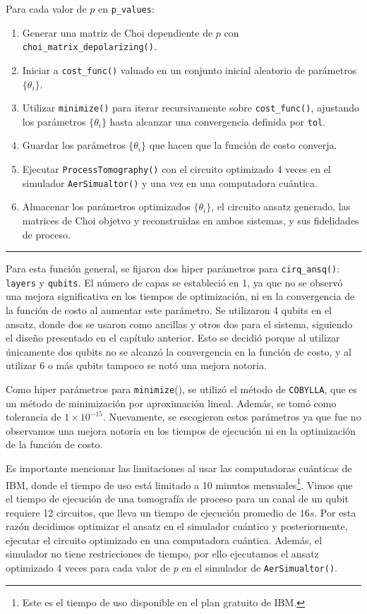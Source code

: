 \documentclass[letterpaper,12pt]{thesisECFM}
\theoremstyle{plain}
\theoremstyle{definition}
\theoremstyle{remark}
\newcommand{\1}{\mathbb{1}}
\begin{document}
Para cada valor de $p$ en \texttt{p\_values}: 
\begin{enumerate}
    \item Generar una matriz de Choi dependiente de $p$ con \texttt{choi\_matrix\_depolarizing()}.
    \item Iniciar a  \texttt{cost\_func()} valuado en un conjunto inicial aleatorio de parámetros $\{\theta_i\}$. 
   \item Utilizar \texttt{minimize()} para iterar recursivamente sobre \texttt{cost\_func()}, ajustando los parámetros $\{\theta_i\}$ hasta alcanzar una convergencia definida por \texttt{tol}.
   \item Guardar los parámetros $\{ \theta_i\}$ que hacen que la función de costo converja. 
   \item Ejecutar \texttt{ProcessTomography()} con el circuito optimizado 4 veces en el simulador \texttt{AerSimualtor()} y una vez en una computadora cuántica. 
    \item Almacenar los parámetros optimizados $\{ \theta_i\}$, el circuito ansatz generado, las matrices de Choi objetvo y reconstruidas en ambos sistemas, y sus fidelidades de proceso. 
\end{enumerate}
\vspace{-.5cm}
\noindent\rule{\textwidth}{1mm}
Para esta función general, se fijaron dos hiper parámetros para \texttt{cirq\_ansq()}: \texttt{layers} y \texttt{qubits}. El número de capas se estableció en 1, ya que no se observó una mejora significativa en los tiempos de optimización, ni en la convergencia de la función de costo al aumentar este parámetro. Se utilizaron 4 qubits en el ansatz, donde dos se usaron como ancillas y otros dos para el sistema, siguiendo el diseño presentado en el capítulo anterior. Esto se decidió porque al utilizar únicamente dos qubits no se alcanzó la convergencia en la función de costo, y al utilizar 6 o más qubits tampoco se notó una mejora notoria.

Como hiper parámetros para \texttt{minimize}(), se utilizó el método de \texttt{COBYLLA}, que es un método de minimización por aproximación lineal. Además, se tomó como tolerancia de $1\times 10^{-15}$. Nuevamente, se escogieron estos parámetros ya que fue no observamos una mejora notoria en los tiempos de ejecución ni en la optimización de la función de costo.

Es importante mencionar las limitaciones al usar las computadoras cuánticas de IBM, donde el tiempo de uso está limitado a 10 minutos mensuales\footnote{Este es el tiempo de uso disponible en el plan gratuito de IBM.}. Vimos que el  tiempo de ejecución de una tomografía de proceso para un canal de un qubit requiere 12 circuitos, que lleva un tiempo de ejecución promedio de $16s$. Por esta razón decidimos optimizar el ansatz en el simulador cuántico y posteriormente, ejecutar el circuito optimizado en una computadora cuántica. Además, el simulador no tiene restricciones de tiempo, por ello ejecutamos el ansatz optimizado 4 veces para cada valor de $p$ en el simulador de \texttt{AerSimualtor()}.
\end{document}
